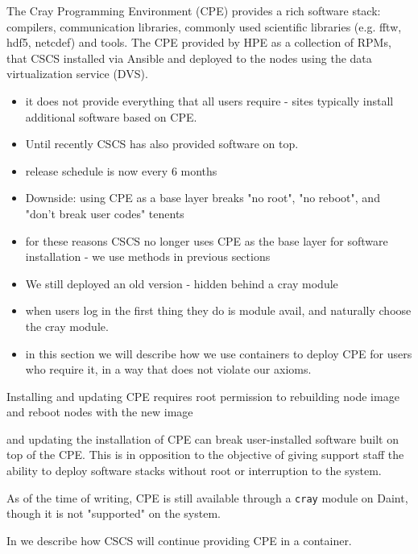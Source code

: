 
The Cray Programming Environment (CPE) provides a rich software stack: compilers, communication libraries, commonly used scientific libraries (e.g. fftw, hdf5, netcdef) and tools.
The CPE provided by HPE as a collection of RPMs, that CSCS installed via Ansible and deployed to the nodes using the data virtualization service (DVS)\cite{dvs}.


\begin{itemize}
    \item it does not provide everything that all users require - sites typically install additional software based on CPE.
    \item Until recently CSCS has also provided software on top.
    \item release schedule is now every 6 months
    \item Downside: using CPE as a base layer breaks "no root", "no reboot", and "don't break user codes" tenents
    \item for these reasons CSCS no longer uses CPE as the base layer for software installation - we use methods in previous sections
    \item We still deployed an old version - hidden behind a cray module
    \item when users log in the first thing they do is module avail, and naturally choose the cray module.
    \item in this section we will describe how we use containers to deploy CPE for users who require it, in a way that does not violate our axioms.
\end{itemize}

Installing and updating CPE requires root permission to rebuilding node image and reboot nodes with the new image

and updating the installation of CPE can break user-installed software built on top of the CPE.
This is in opposition to the objective of giving support staff the ability to deploy software stacks without root or interruption to the system.


As of the time of writing, CPE is still available through a \lstinline{cray} module on Daint, though it is not "supported" on the system.

In  we describe how CSCS will continue providing CPE in a container.
